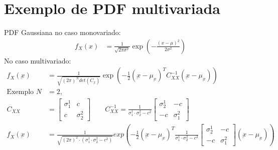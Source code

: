 \documentclass{article}
\renewcommand\u[1]{\underbar{#1}}
\begin{document}
\section{Exemplo de PDF multivariada}
PDF Gaussiana no caso monovariado:
\begin{align*}
f_X(x) &= \frac{1}{\sqrt{2\pi\sigma^2}} \exp\left({-\frac{(x-\mu)^2}{2\sigma^2}}\right)
\end{align*}
No caso multivariado:
\begin{align*}
    f_X(\u{x}) &= \frac{1}{\sqrt{(2\pi)^N det(C_{\u{x}})}} \exp\left({-\frac{1}{2} (\u{x}-\mu_{\u{x}})^T C_{XX}^{-1}(\u{x}-\mu_{\u{x}})}\right) \\
    \text{Exemplo } N &= 2, \\
    C_{XX} &=
    \begin{bmatrix}
        \sigma^1_1 & c\\
        c & \sigma^2_2
    \end{bmatrix} \qquad
    C_{XX}^{-1} = \frac{1}{\sigma_1^1 \cdot \sigma_2^2 - c^2}
    \begin{bmatrix}
        \sigma^1_2 & -c\\
        -c & \sigma^2_1
    \end{bmatrix} \\
    f_X(\u{x}) &= \frac{1}{\sqrt{(2 \pi)^2 \cdot (\sigma_1^1 \cdot \sigma_2^2 - c^2)}}
    exp\left({-\frac{1}{2} (\u{x}-\mu_{\u{x}})^T \frac{1}{\sigma_1^1 \cdot \sigma_2^2 - c^2}
        \begin{bmatrix}
            \sigma^1_2 & -c\\
            -c & \sigma^2_1
        \end{bmatrix}
    (\u{x}-\mu_{\u{x}})}\right)
\end{align*}
\end{document}
